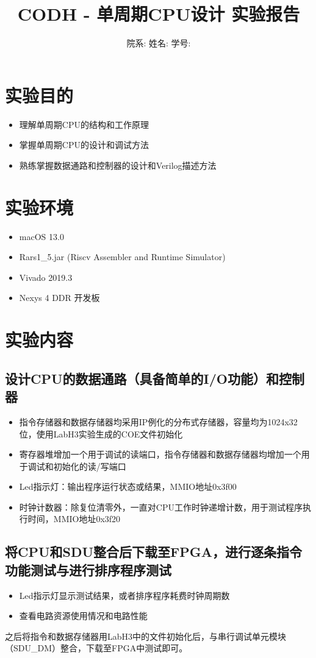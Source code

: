 \documentclass[a4paper]{article}
\title{\heiti 
CODH - 单周期CPU设计 \hspace{0.3cm}实验报告}
\author{院系: \kaishu\underline{}\hspace{1.5cm}姓名: \kaishu \underline{}\hspace{1.5cm}学号: \kaishu \underline{}\hspace{1.5cm}}
\begin{document}
\maketitle

\section{实验目的}
\begin{itemize}
    \item 理解单周期CPU的结构和工作原理
    \item 掌握单周期CPU的设计和调试方法
    \item 熟练掌握数据通路和控制器的设计和Verilog描述方法
\end{itemize}

\section{实验环境}
\begin{itemize}
  \item macOS 13.0
  \item Rars1\_5.jar (Riscv Assembler and Runtime Simulator)
  \item Vivado 2019.3
  \item Nexys 4 DDR 开发板
\end{itemize}
\section{实验内容}
\subsection{设计CPU的数据通路（具备简单的I/O功能）和控制器}
\begin{itemize}
    \item 指令存储器和数据存储器均采用IP例化的分布式存储器，容量均为1024x32位，使用LabH3实验生成的COE文件初始化
    \item 寄存器堆增加一个用于调试的读端口，指令存储器和数据存储器均增加一个用于调试和初始化的读/写端口
    \item Led指示灯：输出程序运行状态或结果，MMIO地址0x3f00
    \item 时钟计数器：除复位清零外，一直对CPU工作时钟递增计数，用于测试程序执行时间，MMIO地址0x3f20  
  \end{itemize}

  \subsection{将CPU和SDU整合后下载至FPGA，进行逐条指令功能测试与进行排序程序测试}
  \begin{itemize}
    \item Led指示灯显示测试结果，或者排序程序耗费时钟周期数
    \item 查看电路资源使用情况和电路性能
  \end{itemize}
之后将指令和数据存储器用LabH3中的文件初始化后，与串行调试单元模块（SDU\_DM）整合，下载至FPGA中测试即可。
\end{document}
